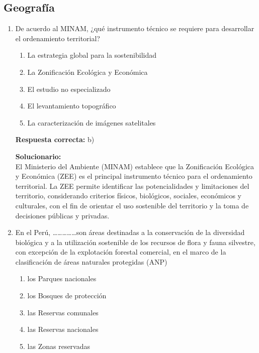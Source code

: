 \subsection*{Geografía}

\begin{enumerate}
	
	\item De acuerdo al MINAM, ¿qué instrumento técnico se requiere para desarrollar el ordenamiento territorial?
	
	\begin{enumerate}[label=\alph*)]
		\item La estrategia global para la sostenibilidad
		\item La Zonificación Ecológica y Económica
		\item El estudio no especializado
		\item El levantamiento topográfico
		\item La caracterización de imágenes satelitales
	\end{enumerate}
	
	\textbf{Respuesta correcta:} b)
	
	\vspace{2mm}
	\textbf{Solucionario:}\\
	El Ministerio del Ambiente (MINAM) establece que la Zonificación Ecológica y Económica (ZEE) es el principal instrumento técnico para el ordenamiento territorial.
	La ZEE permite identificar las potencialidades y limitaciones del territorio, considerando criterios físicos, biológicos, sociales, económicos y culturales, con el fin de orientar el uso sostenible del territorio y la toma de decisiones públicas y privadas.
	
	\vspace{6mm}
	
	\item En el Perú, \dots\dots\dots\dots\dots son áreas destinadas a la conservación de la diversidad biológica y a la utilización sostenible de los recursos de flora y fauna silvestre, con excepción de la explotación forestal comercial, en el marco de la clasificación de áreas naturales protegidas (ANP)
	\begin{enumerate}[label=\alph*)]
		\item los Parques nacionales
		\item los Bosques de protección
		\item las Reservas comunales
		\item las Reservas nacionales
		\item las Zonas reservadas
	\end{enumerate}
	

\end{enumerate}
